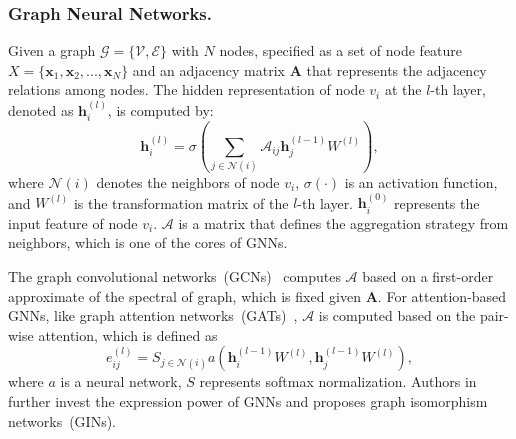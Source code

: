\documentclass[letterpaper]{article} %
\begin{document}
\subsubsection{Graph Neural Networks.}
Given a graph
$\mathcal{G}=\{\mathcal{V},\mathcal{E}\}$
with $N$ nodes, specified as a set of node feature $X =\{\boldsymbol{x}_1, \boldsymbol{x}_2,...,\boldsymbol{x}_N\}$ %
and an adjacency matrix $\boldsymbol{A}$
that represents the adjacency relations among nodes.
The hidden representation of node $v_i$ at the $l$-th layer, denoted as $\boldsymbol{h}_i^{(l)}$, is computed by:
\begin{equation}
\label{gcn}
  \boldsymbol{h}_i^{(l)}=\sigma(\sum_{j \in \mathcal{N}(i)}
   \mathcal{A}_{ij} \boldsymbol{h}_j^{(l-1)} W^{(l)}),
\end{equation}
\noindent where $\mathcal{N}(i)$ denotes the neighbors of node $v_i$,
$\sigma(\cdot)$ is an activation function,
and $W^{(l)}$ is the transformation matrix of the $l$-th layer.
$\boldsymbol{h}_i^{(0)}$ represents the input feature of node $v_i$.
$\mathcal{A}$ is a matrix that defines the aggregation strategy
from neighbors,
which is one of the cores of GNNs.

The graph convolutional networks~(GCNs)~\cite{kipf2016semi}
computes $\mathcal{A}$ based on
a first-order approximate of the spectral of graph, which is fixed
given $\boldsymbol{A}$.
For attention-based GNNs,
like graph attention networks~(GATs)~\cite{velivckovic2017graph},
$\mathcal{A}$ is computed based on the pair-wise attention,
which is defined as
\begin{equation}
\label{eij}
  e_{ij}^{(l)}=S_{j \in \mathcal{N}(i)} a(\boldsymbol{h}_i^{(l-1)} W^{(l)},\boldsymbol{h}_j^{(l-1)} W^{(l)}),
\end{equation}
\noindent where $a$ is a neural network, $S$ represents softmax normalization.
Authors in~\cite{xu2018powerful} further invest the expression power of GNNs
and proposes graph isomorphism networks~(GINs).
\end{document}

